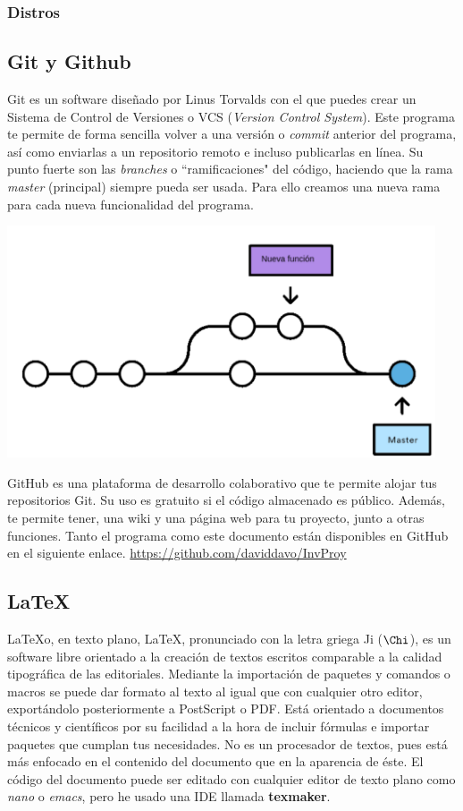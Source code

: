 \documentclass[a4paper, 11pt, twoside]{report} %
\begin{document}
\subsubsection*{Distros}

\subsection{Git y Github}
Git es un software diseñado por Linus Torvalds con el que puedes crear un Sistema de Control de Versiones o VCS (\textit{Version Control System}). Este programa te permite de forma sencilla volver a una versión o \textit{commit} anterior del programa, así como enviarlas a un repositorio remoto e incluso publicarlas en línea. Su punto fuerte son las \textit{branches} o ``ramificaciones" del código, haciendo que la rama \textit{master} (principal) siempre pueda ser usada. Para ello creamos una nueva rama para cada nueva funcionalidad del programa.

\includegraphics[width=0.95\textwidth]{Resources/01.01.02-01.png}

GitHub es una plataforma de desarrollo colaborativo que te permite alojar tus repositorios Git. Su uso es gratuito si el código almacenado es público. Además, te permite tener, una wiki y una página web para tu proyecto, junto a otras funciones.
Tanto el programa como este documento están disponibles en GitHub en el siguiente enlace. \url{https://github.com/daviddavo/InvProy}

\subsection{LaTeX}
\LaTeX\space o, en texto plano, LaTeX, pronunciado con la letra griega 
Ji ($\Chi$), es un software libre orientado a la creación de textos escritos comparable a la calidad tipográfica de las editoriales. Mediante la importación de paquetes y comandos o macros se puede dar formato al texto al igual que con cualquier otro editor, exportándolo posteriormente a PostScript o PDF. Está orientado a documentos técnicos y científicos por su facilidad a la hora de incluir fórmulas e importar paquetes que cumplan tus necesidades. No es un procesador de textos, pues está más enfocado en el contenido del documento que en la aparencia de éste.
El código del documento puede ser editado con cualquier editor de texto plano como \textit{nano} o \textit{emacs}, pero he usado una IDE llamada \textbf{texmaker}.
\end{document}
